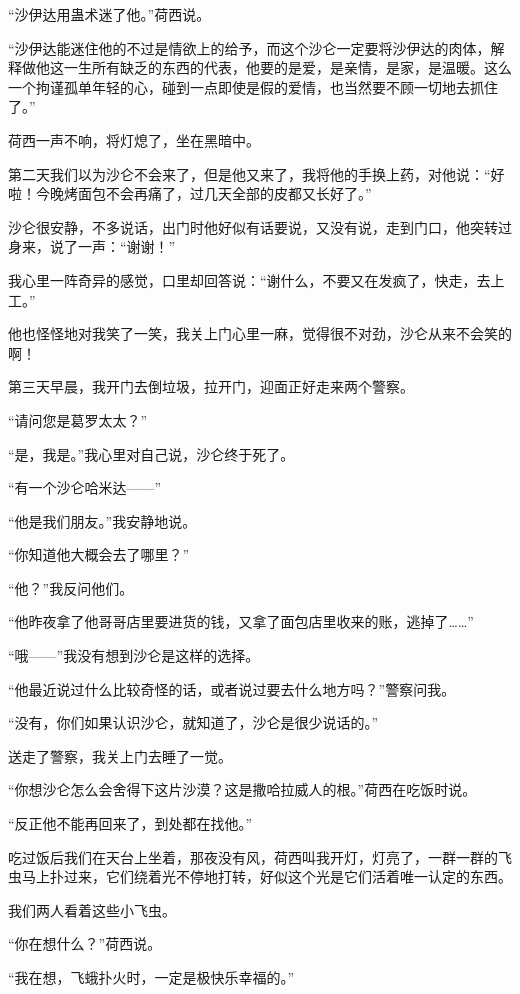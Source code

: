 \par “沙伊达用蛊术迷了他。”荷西说。
\par “沙伊达能迷住他的不过是情欲上的给予，而这个沙仑一定要将沙伊达的肉体，解释做他这一生所有缺乏的东西的代表，他要的是爱，是亲情，是家，是温暖。这么一个拘谨孤单年轻的心，碰到一点即使是假的爱情，也当然要不顾一切地去抓住了。”
\par 荷西一声不响，将灯熄了，坐在黑暗中。
\par 第二天我们以为沙仑不会来了，但是他又来了，我将他的手换上药，对他说：“好啦！今晚烤面包不会再痛了，过几天全部的皮都又长好了。”
\par 沙仑很安静，不多说话，出门时他好似有话要说，又没有说，走到门口，他突转过身来，说了一声：“谢谢！”
\par 我心里一阵奇异的感觉，口里却回答说：“谢什么，不要又在发疯了，快走，去上工。”
\par 他也怪怪地对我笑了一笑，我关上门心里一麻，觉得很不对劲，沙仑从来不会笑的啊！
\par 第三天早晨，我开门去倒垃圾，拉开门，迎面正好走来两个警察。
\par “请问您是葛罗太太？”
\par “是，我是。”我心里对自己说，沙仑终于死了。
\par “有一个沙仑哈米达——”
\par “他是我们朋友。”我安静地说。
\par “你知道他大概会去了哪里？”
\par “他？”我反问他们。
\par “他昨夜拿了他哥哥店里要进货的钱，又拿了面包店里收来的账，逃掉了……”
\par “哦——”我没有想到沙仑是这样的选择。
\par “他最近说过什么比较奇怪的话，或者说过要去什么地方吗？”警察问我。
\par “没有，你们如果认识沙仑，就知道了，沙仑是很少说话的。”
\par 送走了警察，我关上门去睡了一觉。
\par “你想沙仑怎么会舍得下这片沙漠？这是撒哈拉威人的根。”荷西在吃饭时说。
\par “反正他不能再回来了，到处都在找他。”
\par 吃过饭后我们在天台上坐着，那夜没有风，荷西叫我开灯，灯亮了，一群一群的飞虫马上扑过来，它们绕着光不停地打转，好似这个光是它们活着唯一认定的东西。
\par 我们两人看着这些小飞虫。
\par “你在想什么？”荷西说。
\par “我在想，飞蛾扑火时，一定是极快乐幸福的。”



